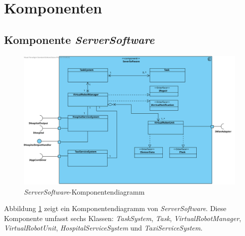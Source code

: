 \section{Komponenten}

\subsection{Komponente \textit{ServerSoftware}}
\begin{figure}[H]
\centering
\includegraphics[height=0.7\textwidth, angle=90]{img/2-Entwurf-5-ServerSoftware}
\caption{\emph{ServerSoftware}-Komponentendiagramm}
\label{KomponentenStruktur1}
\end{figure}
Abbildung \ref{KomponentenStruktur1} zeigt ein Komponentendiagramm von \emph{ServerSoftware}. 
Diese Komponente umfasst sechs Klassen: \textit{TaskSystem}, \textit{Task}, \textit{VirtualRobotManager}, \textit{VirtualRobotUnit}, \textit{HospitalServiceSystem} und \textit{TaxiServiceSystem}.

